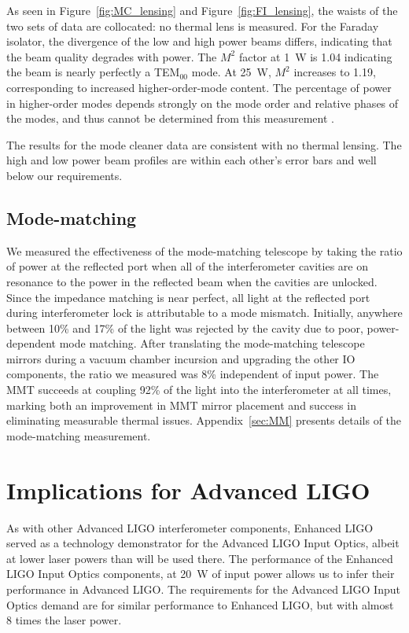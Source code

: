 As seen in Figure~\ref{fig:MC_lensing} and Figure~\ref{fig:FI_lensing}, the
waists of the two sets of data are collocated: no thermal lens is
measured. For the Faraday isolator, the divergence of the low and high
power beams differs, indicating that the beam quality degrades with
power. The $M^2$ factor at 1~W is 1.04 indicating the beam is 
nearly perfectly a TEM$_{00}$ mode. At 25~W, $M^2$ increases to 1.19,
corresponding to increased higher-order-mode content. The percentage
of power in higher-order modes depends strongly on the mode order and
relative phases of the modes, and thus cannot be determined from this
measurement \citep{Kwee2007Laser}.

The results for the mode cleaner data are consistent with no thermal
lensing. The high and low power beam profiles are within each
other's error bars and well below our requirements. 


\subsection{Mode-matching}
We measured the effectiveness of the mode-matching telescope by taking
the ratio of power at the reflected port when all of the
interferometer cavities are on resonance to the power in the reflected
beam when the cavities are unlocked. Since the impedance matching is
near perfect, all light at the reflected port during interferometer
lock is attributable to a mode mismatch. Initially, anywhere between
10\% and 17\% of the light was rejected by the cavity due to poor,
power-dependent mode matching.  After translating the mode-matching
telescope mirrors during a vacuum chamber incursion and upgrading the
other IO components, the ratio we measured was 8\% independent of
input power. The MMT succeeds at coupling 92\% of the light into the
interferometer at all times, marking both an improvement in MMT mirror
placement and success in eliminating measurable thermal
issues. Appendix~\ref{sec:MM} presents details of the mode-matching
measurement.


\section{Implications for Advanced LIGO}
\label{sec:aLIGO}
As with other Advanced LIGO interferometer components, Enhanced LIGO
served as a technology demonstrator for the Advanced LIGO Input
Optics, albeit at lower laser powers than will be used there. The
performance of the Enhanced LIGO Input Optics components, at 20~W of
input power allows us to infer their performance in Advanced LIGO.
The requirements for the Advanced LIGO Input Optics demand are for
similar performance to Enhanced LIGO, but with almost 8 times the
laser power.

